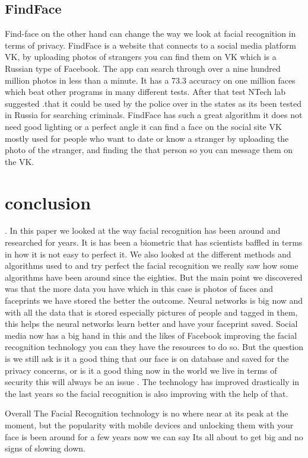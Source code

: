\documentclass[report]{IEEEtran}
\begin{document}
\subsection{FindFace}
Find-face on the other hand can change the way we look at facial recognition in terms of privacy. FindFace is a website that connects to a social media platform VK, by uploading photos of strangers you can find them on VK which is a Russian type of Facebook. The app can search through over a nine hundred million photos in less than a minute. It has a 73.3 accuracy on one million faces which beat other programs in many different tests. After that test NTech lab suggested .that it could be used by the police over in the states as its been tested in Russia for searching criminals. FindFace has such a great algorithm it does not need good lighting or a perfect angle it can find a face on the social site VK mostly used for people who want to date or know a stranger by uploading the photo of the stranger, and finding the that person so you can message them on the VK. 

\section{conclusion}.\newline
In this paper we looked at the way facial recognition has been around and researched for years. It is has been a biometric that has scientists baffled in terms in how it is not easy to perfect it. We also looked at the different methods and algorithms used to and try perfect the facial recognition we really saw how some algorithms have been around since the eighties. But the main point we discovered was that the more data you have which in this case is photos of faces and faceprints we have stored the better the outcome. Neural networks is big now and with all the data that is stored especially pictures of people and tagged in them, this helps the neural networks learn better and have your faceprint saved. Social media now has a big hand in this and the likes of Facebook improving the facial recognition technology you can they have the resources to do so. But the question is we still ask is it a good thing that our face is on database and saved for the privacy concerns, or is it a good thing now in the world we live in terms of security this will always be an issue . The technology has improved drastically in the last years so the facial recognition is also improving with the help of that.

Overall The Facial Recognition technology is no where near at its peak at the moment, but the popularity with mobile devices and unlocking them with your face is been around for a few years now we can say Its all about to get big and no signs of slowing down.  
\end{document}

